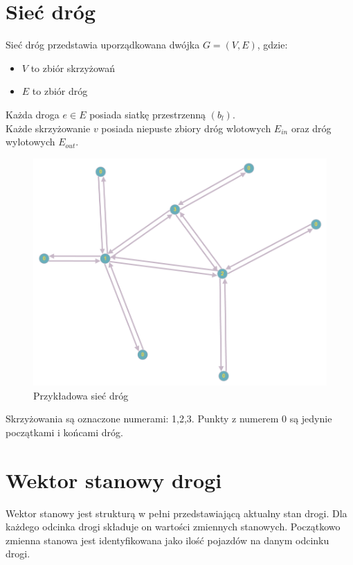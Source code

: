 \documentclass[12pt]{book}
\theoremstyle{plain}
\begin{document}
\section{Sieć dróg}
Sieć dróg przedstawia uporządkowana dwójka $G=(V,E)$, gdzie:
\begin{itemize}
	\item $V$ to zbiór skrzyżowań
	\item $E$ to zbiór dróg
\end{itemize}
Każda droga $e \in E$ posiada siatkę przestrzenną $(b_l)$.\\
Każde skrzyżowanie $v$ posiada niepuste zbiory dróg wlotowych $E_{in}$ oraz dróg wylotowych $E_{out}$.\\
\begin{minipage}{12cm}
	\begin{figure}[H]
		\includegraphics[width=12cm]{network}
		\caption{\label{fig:network} Przykładowa sieć dróg}
	\end{figure}
\end{minipage} \hfill
\begin{minipage}{5cm}
	Skrzyżowania są oznaczone numerami: 1,2,3.
	Punkty z numerem 0 są jedynie początkami i końcami dróg.
\end{minipage}
 \noindent
\section{Wektor stanowy drogi} \label{sec:wektor_stanowy_drogi}
Wektor stanowy jest strukturą w pełni przedstawiającą aktualny stan drogi. Dla każdego odcinka drogi składuje on wartości zmiennych stanowych. Początkowo zmienna stanowa jest identyfikowana jako ilość pojazdów na danym odcinku drogi. 
\end{document}
